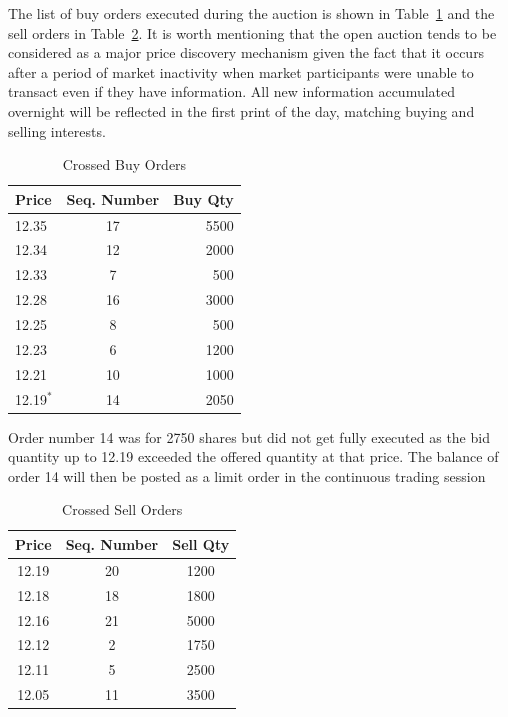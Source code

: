 The list of buy orders executed during the auction is shown in Table~\ref{tab:openAuct4} and the sell orders in Table~\ref{tab:openAuct5}. It is worth mentioning that the open auction tends to be considered as a major price discovery mechanism given the fact that it occurs after a period of market inactivity when market participants were unable to transact even if they have information. All new information accumulated overnight will be reflected in the first print of the day, matching buying and selling interests.  


	\begin{table}[!ht]
   	\centering
   	\caption{Crossed Buy Orders\label{tab:openAuct4}}
   	\begin{tabular}{lcr} 
	Price & Seq. Number & Buy Qty  \\ \hline
	12.35 &  17 & 5500 \\
	12.34 & 12 & 2000 \\	
	12.33 & 7  & 500 \\			
	12.28 &  16 & 3000 \\	
	12.25 & 8 & 500 \\	
	12.23 & 6 & 1200 \\		
	12.21  & 10& 1000 \\		
	12.19$^*$ &  14  & 2050 		
   	\end{tabular} \par
	\begin{minipage}[t]{0.75\textwidth}
	{\small *Order number 14 was for 2750 shares but did not get fully executed as the bid quantity up to 12.19 exceeded the offered quantity at that price. The balance of order 14 will then be posted as a limit order in the continuous trading session}
	\end{minipage}   
	\end{table}

	
	\begin{table}[!ht]
   	\centering
   	\caption{Crossed Sell Orders\label{tab:openAuct5}}
   	\begin{tabular}{ccc} 
	Price & Seq. Number & Sell Qty  \\ \hline
	12.19 &  20 & 1200 \\
	12.18 &  18 & 1800 \\
	12.16 &  21 & 5000 \\
	12.12 & 2 & 1750 \\		
	12.11 & 5 & 2500 \\				
	12.05 & 11 & 3500 		
   	\end{tabular}
	\end{table}	


